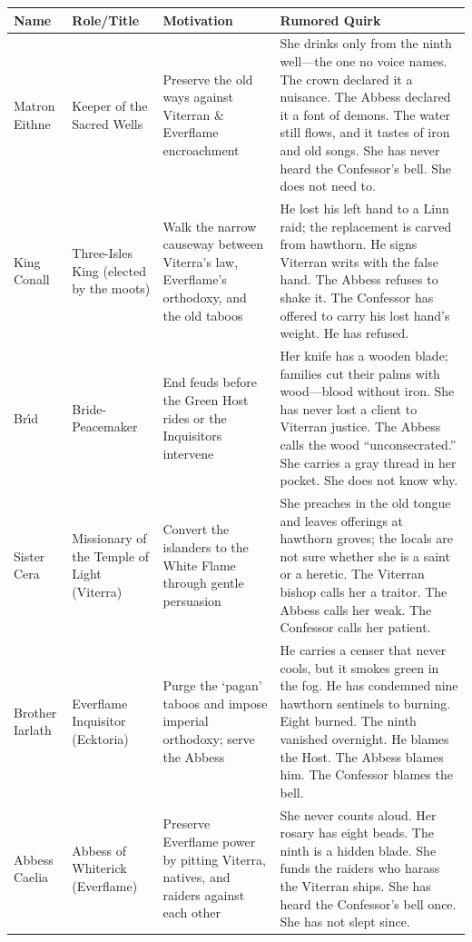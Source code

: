 \begin{longtable}{|p{}|p{}|p{}|p{}|}
\hline
\textbf{Name} & \textbf{Role/Title} & \textbf{Motivation} & \textbf{Rumored Quirk} \\
\hline
Matron Eithne & Keeper of the Sacred Wells & Preserve the old ways against Viterran \& Everflame encroachment & She drinks only from the ninth well---the one no voice names. The crown declared it a nuisance. The Abbess declared it a font of demons. The water still flows, and it tastes of iron and old songs. She has never heard the Confessor's bell. She does not need to. \\
\hline
King Conall & Three-Isles King (elected by the moots) & Walk the narrow causeway between Viterra's law, Everflame's orthodoxy, and the old taboos & He lost his left hand to a Linn raid; the replacement is carved from hawthorn. He signs Viterran writs with the false hand. The Abbess refuses to shake it. The Confessor has offered to carry his lost hand's weight. He has refused. \\
\hline
Br\'{\i}d & Bride-Peacemaker & End feuds before the Green Host rides or the Inquisitors intervene & Her knife has a wooden blade; families cut their palms with wood---blood without iron. She has never lost a client to Viterran justice. The Abbess calls the wood ``unconsecrated.'' She carries a gray thread in her pocket. She does not know why. \\
\hline
Sister Cera & Missionary of the Temple of Light (Viterra) & Convert the islanders to the White Flame through gentle persuasion & She preaches in the old tongue and leaves offerings at hawthorn groves; the locals are not sure whether she is a saint or a heretic. The Viterran bishop calls her a traitor. The Abbess calls her weak. The Confessor calls her patient. \\
\hline
Brother Iarlath & Everflame Inquisitor (Ecktoria) & Purge the `pagan' taboos and impose imperial orthodoxy; serve the Abbess & He carries a censer that never cools, but it smokes green in the fog. He has condemned nine hawthorn sentinels to burning. Eight burned. The ninth vanished overnight. He blames the Host. The Abbess blames him. The Confessor blames the bell. \\
\hline
Abbess Caelia & Abbess of Whiterick (Everflame) & Preserve Everflame power by pitting Viterra, natives, and raiders against each other & She never counts aloud. Her rosary has eight beads. The ninth is a hidden blade. She funds the raiders who harass the Viterran ships. She has heard the Confessor's bell once. She has not slept since. \\

\end{longtable}
